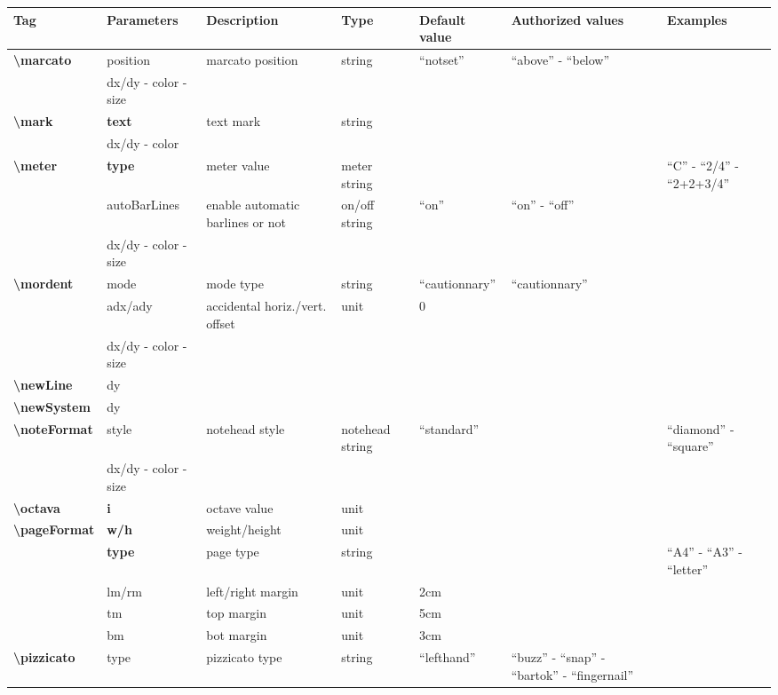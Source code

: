 \documentclass[a4paper, landscape, 10pt]{article}
\begin{document}
\begin{tabularx}{\linewidth}{p{3cm}p{3cm}p{5cm}p{3cm}p{2cm}p{3.5cm}p{4cm}}
    \hline
    \textbf{Tag}&\textbf{Parameters}&\textbf{Description}&\textbf{Type}&\textbf{Default value}&\textbf{Authorized values}&\textbf{Examples}\\
    \hline
    \textbf{\textbackslash{}marcato}&position&marcato position&string&``notset''&``above'' - ``below''&\\
    &dx/dy - color - size&&&&&\\
    \hline
    \textbf{\textbackslash{}mark}&\textbf{text}&text mark&string&&&\\
    &dx/dy - color&&&&&\\
    \hline
    \textbf{\textbackslash{}meter}&\textbf{type}&meter value&meter string&&&``C'' - ``2/4'' - ``2+2+3/4''\\
    &autoBarLines&enable automatic barlines or not&on/off string&``on''&``on'' - ``off''&\\
    &dx/dy - color - size&&&&&\\
    \hline
    \textbf{\textbackslash{}mordent}&mode&mode type&string&``cautionnary''&``cautionnary''&\\
    &adx/ady&accidental horiz./vert. offset&unit&0&&\\
    &dx/dy - color - size&&&&&\\
    \hline
    \textbf{\textbackslash{}newLine}&dy&&&&&\\ %
    \hline
    \textbf{\textbackslash{}newSystem}&dy&&&&&\\ %
    \hline
    \textbf{\textbackslash{}noteFormat}&style&notehead style&notehead string&``standard''&&``diamond'' - ``square''\\
	&dx/dy - color - size&&&&&\\
    \hline
    \textbf{\textbackslash{}octava}&\textbf{i}&octave value&unit&&&\\
    \hline
    \textbf{\textbackslash{}pageFormat}&\textbf{w/h}&weight/height&unit&&&\\
    &\textbf{type}&page type&string&&&``A4'' - ``A3'' - ``letter''\\
    &lm/rm&left/right margin&unit&2cm&&\\
    &tm&top margin&unit&5cm&&\\
    &bm&bot margin&unit&3cm&&\\
    \hline
    \textbf{\textbackslash{}pizzicato}&type&pizzicato type&string&``lefthand''&``buzz'' - ``snap'' - ``bartok'' - ``fingernail''&\\

\end{tabularx}
\end{document}
